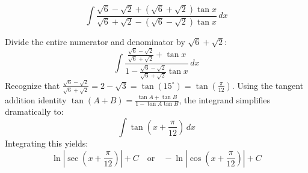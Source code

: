 \begin{questions}
    \question
    \[ \int \frac{\sqrt{6} - \sqrt{2} + (\sqrt{6} + \sqrt{2}) \tan x}{\sqrt{6} + \sqrt{2} - (\sqrt{6} - \sqrt{2}) \tan x} \, dx \]
    \begin{solution}
        Divide the entire numerator and denominator by $\sqrt{6} + \sqrt{2}$:
        \[ \int \frac{\frac{\sqrt{6} - \sqrt{2}}{\sqrt{6} + \sqrt{2}} + \tan x}{1 - \frac{\sqrt{6} - \sqrt{2}}{\sqrt{6} + \sqrt{2}} \tan x} \, dx \]
        Recognize that $\frac{\sqrt{6} - \sqrt{2}}{\sqrt{6} + \sqrt{2}} = 2 - \sqrt{3} = \tan(15^\circ) = \tan\left(\frac{\pi}{12}\right)$. Using the tangent addition identity $\tan(A+B) = \frac{\tan A + \tan B}{1 - \tan A \tan B}$, the integrand simplifies dramatically to:
        \[ \int \tan\left(x + \frac{\pi}{12}\right) \, dx \]
        Integrating this yields:
        \[ \ln\left|\sec\left(x + \frac{\pi}{12}\right)\right| + C \quad \text{or} \quad -\ln\left|\cos\left(x + \frac{\pi}{12}\right)\right| + C \]
    \end{solution}
\end{questions}

